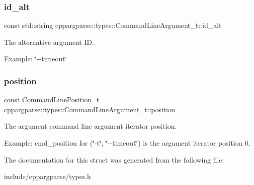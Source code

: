 \subsubsection{\texorpdfstring{id\+\_\+alt}{id\_alt}}
{\footnotesize\ttfamily const std\+::string cppargparse\+::types\+::\+Command\+Line\+Argument\+\_\+t\+::id\+\_\+alt}



The alternative argument ID. 

Example\+: \char`\"{}-\/-\/timeout\char`\"{} \mbox{\label{structcppargparse_1_1types_1_1CommandLineArgument__t_a942c3909aa9951e8e06fa2b3aaa77054}} 
\subsubsection{\texorpdfstring{position}{position}}
{\footnotesize\ttfamily const Command\+Line\+Position\+\_\+t cppargparse\+::types\+::\+Command\+Line\+Argument\+\_\+t\+::position}



The argument command line argument iterator position. 

Example\+: cmd\+\_\+position for (\char`\"{}-\/t\char`\"{}, \char`\"{}-\/-\/timeout\char`\"{}) is the argument iterator position 0. 

The documentation for this struct was generated from the following file\+:\begin{DoxyCompactItemize}
\item 
include/cppargparse/types.\+h\end{DoxyCompactItemize}
